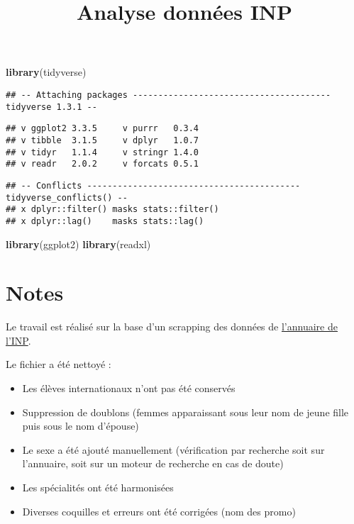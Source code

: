 \documentclass[
]{article}
\title{Analyse données INP}
\author{}
\date{\vspace{-2.5em}}
\newenvironment{Shaded}{\begin{snugshade}}{\end{snugshade}}
\newcommand{\KeywordTok}[1]{\textcolor[rgb]{0.13,0.29,0.53}{\textbf{#1}}}
\newcommand{\NormalTok}[1]{#1}
\begin{document}
\maketitle

\begin{Shaded}
\begin{Highlighting}[]
\KeywordTok{library}\NormalTok{(tidyverse)}
\end{Highlighting}
\end{Shaded}

\begin{verbatim}
## -- Attaching packages --------------------------------------- tidyverse 1.3.1 --
\end{verbatim}

\begin{verbatim}
## v ggplot2 3.3.5     v purrr   0.3.4
## v tibble  3.1.5     v dplyr   1.0.7
## v tidyr   1.1.4     v stringr 1.4.0
## v readr   2.0.2     v forcats 0.5.1
\end{verbatim}

\begin{verbatim}
## -- Conflicts ------------------------------------------ tidyverse_conflicts() --
## x dplyr::filter() masks stats::filter()
## x dplyr::lag()    masks stats::lag()
\end{verbatim}

\begin{Shaded}
\begin{Highlighting}[]
\KeywordTok{library}\NormalTok{(ggplot2)}
\KeywordTok{library}\NormalTok{(readxl)}
\end{Highlighting}
\end{Shaded}

\hypertarget{notes}{%
\section{Notes}\label{notes}}

Le travail est réalisé sur la base d'un scrapping des données de
\href{https://ent.inp.fr/mod/data/view.php?id=3227}{l'annuaire de
l'INP}.

Le fichier a été nettoyé :

\begin{itemize}
\item
  Les élèves internationaux n'ont pas été conservés
\item
  Suppression de doublons (femmes apparaissant sous leur nom de jeune
  fille puis sous le nom d'épouse)
\item
  Le sexe a été ajouté manuellement (vérification par recherche soit sur
  l'annuaire, soit sur un moteur de recherche en cas de doute)
\item
  Les spécialités ont été harmonisées
\item
  Diverses coquilles et erreurs ont été corrigées (nom des promo)
\end{itemize}
\end{document}
